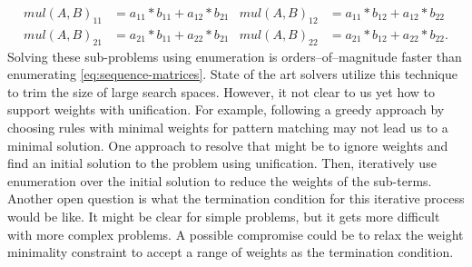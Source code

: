 \begin{description}
%
\begin{align*}
    mul(A,B)_{11} &= a_{11} * b_{11} + a_{12} * b_{21} &
    mul(A,B)_{12} &= a_{11} * b_{12} + a_{12} * b_{22} \\
    mul(A,B)_{21} &= a_{21} * b_{11} + a_{22} * b_{21} &
    mul(A,B)_{22} &= a_{21} * b_{12} + a_{22} * b_{22}. 
\end{align*}
%
Solving these sub-problems using enumeration is orders--of--magnitude faster than enumerating \eqref{eq:sequence-matrices}.
%
State of the art solvers utilize this technique to trim the size of large search spaces.
%
However, it not clear to us yet how to support weights with unification.
%
For example, following a greedy approach by choosing rules with minimal weights for pattern matching may not lead us to a minimal solution.
%
One approach to resolve that might be to ignore weights and find an initial solution to the problem using unification.
%
Then, iteratively use enumeration over the initial solution to reduce the weights of the sub-terms.
%
Another open question is what the termination condition for this iterative process would be like.
%
It might be clear for simple problems, but it gets more difficult with more complex problems.
%
%
A possible compromise could be to relax the weight minimality constraint to accept a range of weights as the termination condition.
%
\end{description}